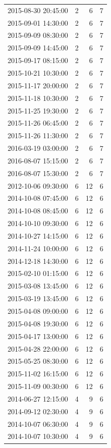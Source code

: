 \begin{tabular}{lrrr}
2015-08-30 20:45:00 & 2 & 6 & 7 \\
2015-09-01 14:30:00 & 2 & 6 & 7 \\
2015-09-09 08:30:00 & 2 & 6 & 7 \\
2015-09-09 14:45:00 & 2 & 6 & 7 \\
2015-09-17 08:15:00 & 2 & 6 & 7 \\
2015-10-21 10:30:00 & 2 & 6 & 7 \\
2015-11-17 20:00:00 & 2 & 6 & 7 \\
2015-11-18 10:30:00 & 2 & 6 & 7 \\
2015-11-25 19:30:00 & 2 & 6 & 7 \\
2015-11-26 06:45:00 & 2 & 6 & 7 \\
2015-11-26 11:30:00 & 2 & 6 & 7 \\
2016-03-19 03:00:00 & 2 & 6 & 7 \\
2016-08-07 15:15:00 & 2 & 6 & 7 \\
2016-08-07 15:30:00 & 2 & 6 & 7 \\
2012-10-06 09:30:00 & 6 & 12 & 6 \\
2014-10-08 07:45:00 & 6 & 12 & 6 \\
2014-10-08 08:45:00 & 6 & 12 & 6 \\
2014-10-10 09:30:00 & 6 & 12 & 6 \\
2014-10-27 14:15:00 & 6 & 12 & 6 \\
2014-11-24 10:00:00 & 6 & 12 & 6 \\
2014-12-18 14:30:00 & 6 & 12 & 6 \\
2015-02-10 01:15:00 & 6 & 12 & 6 \\
2015-03-08 13:45:00 & 6 & 12 & 6 \\
2015-03-19 13:45:00 & 6 & 12 & 6 \\
2015-04-08 09:00:00 & 6 & 12 & 6 \\
2015-04-08 19:30:00 & 6 & 12 & 6 \\
2015-04-17 13:00:00 & 6 & 12 & 6 \\
2015-04-28 22:00:00 & 6 & 12 & 6 \\
2015-05-25 08:30:00 & 6 & 12 & 6 \\
2015-11-02 16:15:00 & 6 & 12 & 6 \\
2015-11-09 00:30:00 & 6 & 12 & 6 \\
2014-06-27 12:15:00 & 4 & 9 & 6 \\
2014-09-12 02:30:00 & 4 & 9 & 6 \\
2014-10-07 06:30:00 & 4 & 9 & 6 \\
2014-10-07 10:30:00 & 4 & 9 & 6 \\

\end{tabular}
